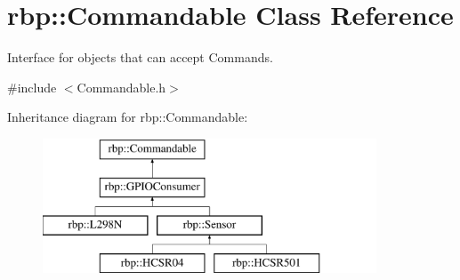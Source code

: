 \hypertarget{classrbp_1_1Commandable}{}\section{rbp\+:\+:Commandable Class Reference}
\label{classrbp_1_1Commandable}


Interface for objects that can accept Commands.  




{\ttfamily \#include $<$Commandable.\+h$>$}

Inheritance diagram for rbp\+:\+:Commandable\+:\begin{figure}[H]
\begin{center}
\leavevmode
\includegraphics[height=4.000000cm]{classrbp_1_1Commandable}
\end{center}
\end{figure}
